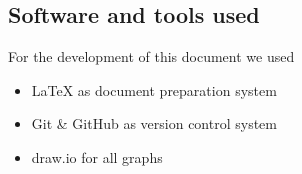 \begin{appendices}
	\section{Software and tools used}
	For the development of this document we used
	\begin{itemize}
		\item \LaTeX{} as document preparation system
		\item Git \& GitHub as version control system
		\item draw.io for all graphs
	\end{itemize}
\end{appendices}